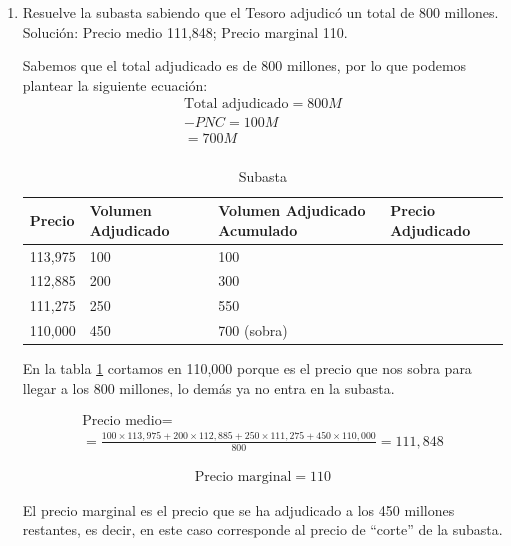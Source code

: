 \begin{enumerate}[label=\textbf{\alph*)}]
    \item Resuelve la subasta sabiendo que el Tesoro adjudicó un total de 800 millones.\\
    Solución: Precio medio 111,848; Precio marginal 110.

    Sabemos que el total adjudicado es de 800 millones, por lo que podemos plantear la siguiente ecuación:
    \begin{align*}
        \text{Total adjudicado} = 800 M \\
        - PNC = 100 M \\
        = 700 M \\
    \end{align*}

    \begin{table}[h]
        \centering
        \begin{tabular}{p{2cm}p{2cm}p{2cm}p{2cm}}
            \toprule
            \textbf{Precio} & \textbf{Volumen Adjudicado} & \textbf{Volumen Adjudicado Acumulado} & \textbf{Precio Adjudicado}  \\
            \midrule
            113,975&100&100&\\
            112,885&200&300&\\
            111,275&250&550&\\
            110,000&450&700 (sobra)&\\
            \bottomrule
        \end{tabular}
        \caption{Subasta}
        \label{tab:subastaej7}
    \end{table}
    En la tabla \ref{tab:subastaej7} cortamos en 110,000 porque es el precio que nos sobra para llegar a los 800 millones, lo demás ya no entra en la subasta.

    \begin{align*}
        \text{Precio medio} = \\ = \frac{100 \times 113,975 + 200 \times 112,885 + 250 \times 111,275 + 450 \times 110,000}{800} = 111,848
    \end{align*}

    \begin{align*}
        \text{Precio marginal} = 110
    \end{align*}

    El precio marginal es el precio que se ha adjudicado a los 450 millones restantes, es decir, en este caso corresponde al precio de ``corte'' de la subasta.


\end{enumerate}
